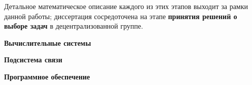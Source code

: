 Детальное математическое описание каждого из этих этапов выходит за рамки данной работы; диссертация сосредоточена на этапе \textbf{принятия решений о выборе задач} в децентрализованной группе.

\vspace{1em}
\textbf{Вычислительные системы}



\vspace{1em}
\textbf{Подсистема связи}



\vspace{1em}
\textbf{Программное обеспечение}

